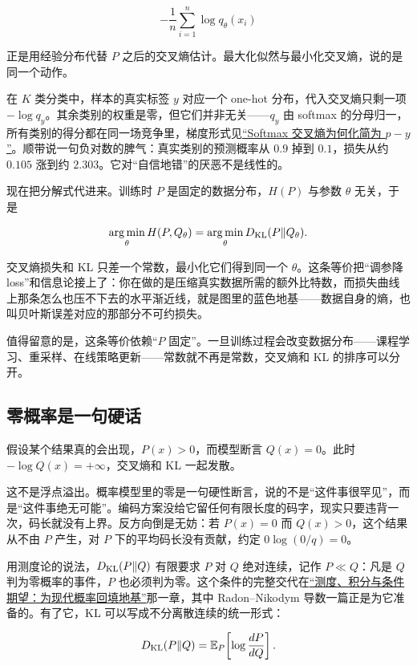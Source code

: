 \[
-\frac{1}{n}\sum_{i=1}^n \log q_\theta(x_i)
\]

正是用经验分布代替 \(P\) 之后的交叉熵估计。最大化似然与最小化交叉熵，说的是同一个动作。

在 \(K\) 类分类中，样本的真实标签 \(y\) 对应一个 one-hot 分布，代入交叉熵只剩一项 \(-\log q_y\)。其余类别的权重是零，但它们并非无关——\(q_y\) 由 softmax 的分母归一，所有类别的得分都在同一场竞争里，梯度形式见\hyperref[sec:10-Matrix-Calculus/04-Applications/02]{``Softmax 交叉熵为何化简为 \(p-y\)''}。顺带说一句负对数的脾气：真实类别的预测概率从 \(0.9\) 掉到 \(0.1\)，损失从约 \(0.105\) 涨到约 \(2.303\)。它对``自信地错''的厌恶不是线性的。

现在把分解式代进来。训练时 \(P\) 是固定的数据分布，\(H(P)\) 与参数 \(\theta\) 无关，于是

\[
\operatorname*{arg\,min}_\theta H(P, Q_\theta) = \operatorname*{arg\,min}_\theta D_{\mathrm{KL}}(P \| Q_\theta).
\]

交叉熵损失和 KL 只差一个常数，最小化它们得到同一个 \(\theta\)。这条等价把``调参降 loss''和信息论接上了：你在做的是压缩真实数据所需的额外比特数，而损失曲线上那条怎么也压不下去的水平渐近线，就是图里的蓝色地基——数据自身的熵，也叫贝叶斯误差对应的那部分不可约损失。

值得留意的是，这条等价依赖``\(P\) 固定''。一旦训练过程会改变数据分布——课程学习、重采样、在线策略更新——常数就不再是常数，交叉熵和 KL 的排序可以分开。

\subsection{零概率是一句硬话}

假设某个结果真的会出现，\(P(x)>0\)，而模型断言 \(Q(x)=0\)。此时 \(-\log Q(x)=+\infty\)，交叉熵和 KL 一起发散。

这不是浮点溢出。概率模型里的零是一句硬性断言，说的不是``这件事很罕见''，而是``这件事绝无可能''。编码方案没给它留任何有限长度的码字，现实只要违背一次，码长就没有上界。反方向倒是无妨：若 \(P(x)=0\) 而 \(Q(x)>0\)，这个结果从不由 \(P\) 产生，对 \(P\) 下的平均码长没有贡献，约定 \(0\log(0/q)=0\)。

用测度论的说法，\(D_{\mathrm{KL}}(P\|Q)\) 有限要求 \(P\) 对 \(Q\) 绝对连续，记作 \(P\ll Q\)：凡是 \(Q\) 判为零概率的事件，\(P\) 也必须判为零。这个条件的完整交代在\hyperref[ch:101]{``测度、积分与条件期望：为现代概率回填地基''}那一章，其中 Radon--Nikodym 导数一篇正是为它准备的。有了它，KL 可以写成不分离散连续的统一形式：

\[
D_{\mathrm{KL}}(P \| Q) = \mathbb{E}_P\!\left[\log \frac{dP}{dQ}\right].
\]

